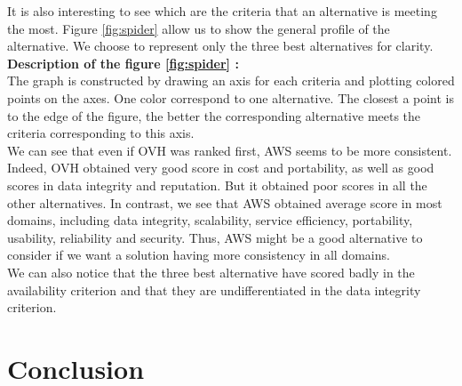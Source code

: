 \documentclass[a4paper,11pt]{article}
\begin{document}
It is also interesting to see which are the criteria that an alternative is meeting the most. Figure \ref{fig:spider} allow us to show the general profile of the alternative. We choose to represent only the three best alternatives for clarity.\\

\textbf{Description of the figure \ref{fig:spider} :}\\

The graph is constructed by drawing an axis for each criteria and plotting colored points on the axes. One color correspond to one alternative. The closest a point is to the edge of the figure, the better the corresponding alternative meets the criteria corresponding to this axis.\\

We can see that even if OVH was ranked first, AWS seems to be more consistent. Indeed, OVH obtained very good score in cost and portability, as well as good scores in data integrity and reputation. But it obtained poor scores in all the other alternatives. In contrast, we see that AWS obtained average score in most domains, including data integrity, scalability, service efficiency, portability, usability, reliability and security. Thus, AWS might be a good alternative to consider if we want a solution having more consistency in all domains. \\

We can also notice that the three best alternative have scored badly in the \og availability \fg{} criterion and that they are undifferentiated in the \og data integrity \fg{} criterion.


\section{Conclusion}
\end{document}

